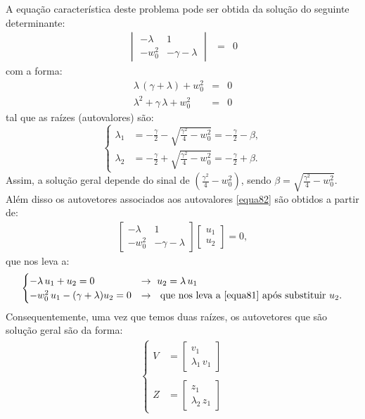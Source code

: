 \documentclass[12pt,openright,twoside,english,brazil]{abntex2}
\begin{document}
A equação característica deste problema pode ser obtida da solução do seguinte determinante:
\begin{eqnarray}
 \begin{vmatrix}
  -\lambda & 1 \\
  -w_0^2 & -\gamma -\lambda
 \end{vmatrix} & = & 0
 \label{equa80} 
\end{eqnarray}
com a forma:
\begin{eqnarray}
 \lambda\, (\gamma + \lambda) + w_0^2 & = & 0 \nonumber \\
 \lambda^2 + \gamma\, \lambda + w_0^2 & = & 0
 \label{equa81}
\end{eqnarray}
tal que as raízes (autovalores) são:
\begin{equation}
 \begin{cases}
   \lambda_1 & =  -\frac{\gamma}{2} - \sqrt{\frac{\gamma^2}{4} - w_0^2} = -\frac{\gamma}{2} - \beta, \\
   \lambda_2 & =  -\frac{\gamma}{2} + \sqrt{\frac{\gamma^2}{4} - w_0^2} = -\frac{\gamma}{2} + \beta.
 \end{cases}
 \label{equa82}
\end{equation}
Assim, a solução geral depende do sinal de $\left(\frac{\gamma^2}{4} - w_0^2 \right)$, sendo $\beta = \sqrt{\frac{\gamma^2}{4} - w_0^2}$. Além disso os autovetores associados aos autovalores \ref{equa82} são obtidos a partir de:
\begin{eqnarray}
 \begin{bmatrix}
 -\lambda & 1 \\
 -w_0^2 & -\gamma - \lambda
 \end{bmatrix} \begin{bmatrix}
                 u_1 \\
                 u_2
                \end{bmatrix} = 0,
 \label{equa83}
\end{eqnarray}
que nos leva a:
\begin{equation}
 \begin{cases}
  -\lambda \, u_1 + u_2 = 0 & \rightarrow \, \,  u_2 = \lambda \, u_1 \\
  -w_0^2 \, u_1 - (\gamma + \lambda) u_2 = 0 & \rightarrow \, \,  \text{ que nos leva a \ref{equa81} após substituir $u_2$}.
 \end{cases}
 \label{equa84}
\end{equation}
Consequentemente, uma vez que temos duas raízes, os autovetores que são solução geral são da forma:
\begin{eqnarray}
 \begin{cases}
  V & = \begin{bmatrix}
         v_1 \\
         \lambda_1 \, v_1
         \end{bmatrix} \\
    & \\
  Z & = \begin{bmatrix}
         z_1 \\
         \lambda_2 \, z_1
        \end{bmatrix}
 \end{cases}
 \label{equa85}     
\end{eqnarray}
\end{document}
